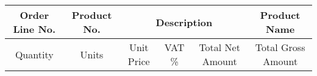 \documentclass[12pt]{article}
\begin{document}
\vspace{1cm}

\begin{table}[h]
\centering
\begin{tabular}{|c|c|c|c|c|c|}
\hline
\multicolumn{1}{|c|}{Order Line No.} & \multicolumn{1}{c|}{Product No.} & \multicolumn{3}{c|}{Description} & {Product Name} \\
\hline
Quantity & Units & Unit Price & VAT \% & Total Net Amount & Total Gross Amount \\
\hline
\end{tabular}
\end{table}

\noindent\hfill{}
\end{document}
